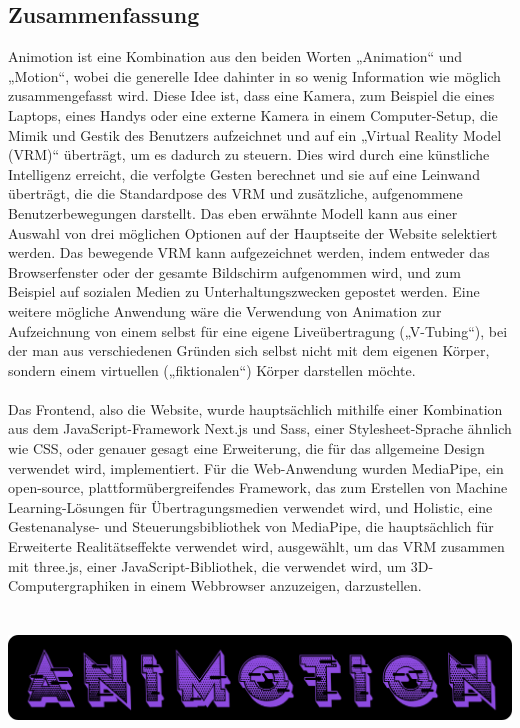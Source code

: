 \newpage
\begin{spacing}{1}
    \chapter*{Zusammenfassung}
\end{spacing}
Animotion ist eine Kombination aus den beiden Worten „Animation“ und „Motion“, wobei die generelle Idee dahinter in so wenig Information wie möglich zusammengefasst wird. Diese Idee ist, dass eine Kamera, zum Beispiel die eines Laptops, eines Handys oder eine externe Kamera in einem Computer-Setup, die Mimik und Gestik des Benutzers aufzeichnet und auf ein „Virtual Reality Model (VRM)“ überträgt, um es dadurch zu steuern. Dies wird durch eine künstliche Intelligenz erreicht, die verfolgte Gesten berechnet und sie auf eine Leinwand überträgt, die die Standardpose des VRM und zusätzliche, aufgenommene Benutzerbewegungen darstellt. Das eben erwähnte Modell kann aus einer Auswahl von drei möglichen Optionen auf der Hauptseite der Website selektiert werden. Das bewegende VRM kann aufgezeichnet werden, indem entweder das Browserfenster oder der gesamte Bildschirm aufgenommen wird, und zum Beispiel auf sozialen Medien zu Unterhaltungszwecken gepostet werden. Eine weitere mögliche Anwendung wäre die Verwendung von Animation zur Aufzeichnung von einem selbst für eine eigene Liveübertragung („V-Tubing“), bei der man aus verschiedenen Gründen sich selbst nicht mit dem eigenen Körper, sondern einem virtuellen („fiktionalen“) Körper darstellen möchte.
\\
\\
Das Frontend, also die Website, wurde hauptsächlich mithilfe einer Kombination aus dem JavaScript-Framework Next.js und Sass, einer Stylesheet-Sprache ähnlich wie CSS, oder genauer gesagt eine Erweiterung, die für das allgemeine Design verwendet wird, implementiert. Für die Web-Anwendung wurden MediaPipe, ein open-source, plattformübergreifendes Framework, das zum Erstellen von Machine Learning-Lösungen für Übertragungsmedien verwendet wird, und Holistic, eine Gestenanalyse- und Steuerungsbibliothek von MediaPipe, die hauptsächlich für Erweiterte Realitätseffekte verwendet wird, ausgewählt, um das VRM zusammen mit three.js, einer JavaScript-Bibliothek, die verwendet wird, um 3D-Computergraphiken in einem Webbrowser anzuzeigen, darzustellen.
\\
\\
\\
\includegraphics[width=1\textwidth]{pics/animotionlogo.png}
